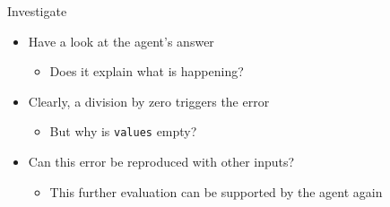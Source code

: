 \documentclass[
ps,
]{prosper}
\begin{document}
\begin{slide}{Investigate}

\begin{itemize}

\item Have a look at the agent's answer

  \begin{itemize}
    
  \item Does it explain what is happening?
    
  \end{itemize}

\item Clearly, a division by zero triggers the error

  \begin{itemize}
    
  \item But why is \texttt{values} empty?
    
  \end{itemize}

\item Can this error be reproduced with other inputs?

  \begin{itemize}
    
  \item This further evaluation can be supported by the agent again
    
  \end{itemize}
  
\end{itemize}
  
\end{slide}
\end{document}
